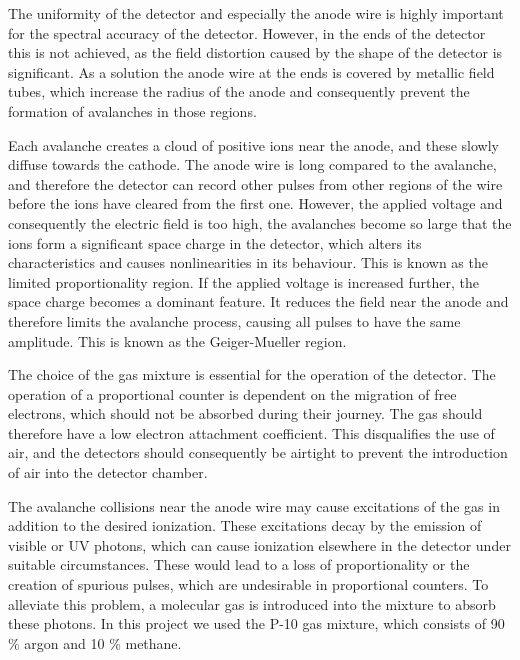 \documentclass[a4paper]{article}
\begin{document}
The uniformity of the detector and especially the anode wire is highly important for the spectral accuracy of the detector.
However, in the ends of the detector this is not achieved, as the field distortion caused by the shape of the detector is significant.
As a solution the anode wire at the ends is covered by metallic field tubes, which increase the radius of the anode and consequently prevent the formation of avalanches in those regions.
\cite[p. 165]{knoll_radiation_2010}

Each avalanche creates a cloud of positive ions near the anode, and these slowly diffuse towards the cathode.
The anode wire is long compared to the avalanche, and therefore the detector can record other pulses from other regions of the wire before the ions have cleared from the first one.
However, the applied voltage and consequently the electric field is too high, the avalanches become so large that the ions form a significant space charge in the detector, which alters its characteristics and causes nonlinearities in its behaviour.
This is known as the limited proportionality region.
If the applied voltage is increased further, the space charge becomes a dominant feature.
It reduces the field near the anode and therefore limits the avalanche process, causing all pulses to have the same amplitude.
This is known as the Geiger-Mueller region.
\cite[p. 160--161]{knoll_radiation_2010}

The choice of the gas mixture is essential for the operation of the detector.
The operation of a proportional counter is dependent on the migration of free electrons, which should not be absorbed during their journey.
The gas should therefore have a low electron attachment coefficient.
This disqualifies the use of air, and the detectors should consequently be airtight to prevent the introduction of air into the detector chamber.
\cite[p. 167--168]{knoll_radiation_2010}

The avalanche collisions near the anode wire may cause excitations of the gas in addition to the desired ionization.
These excitations decay by the emission of visible or UV photons, which can cause ionization elsewhere in the detector under suitable circumstances.
These would lead to a loss of proportionality or the creation of spurious pulses, which are undesirable in proportional counters.
To alleviate this problem, a molecular gas is introduced into the mixture to absorb these photons.
In this project we used the P-10 gas mixture, which consists of 90 \% argon and 10 \% methane.
\cite[p. 168]{knoll_radiation_2010}
\end{document}
